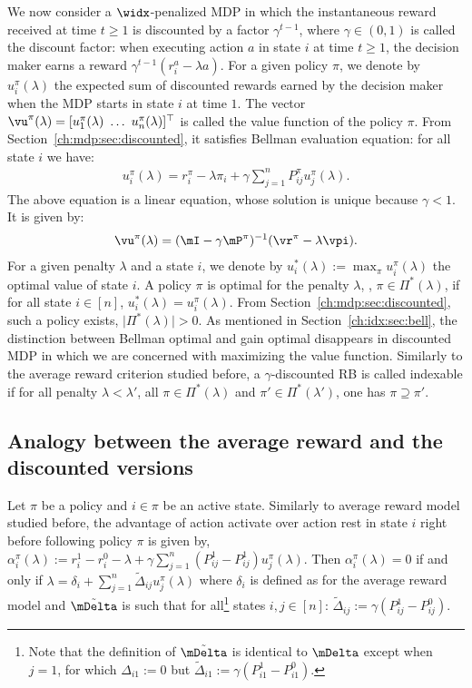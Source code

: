 We now consider a $\widx$-penalized MDP in which the instantaneous reward received at time $t\ge1$ is discounted by a factor $\gamma^{t-1}$, where $\gamma\in(0,1)$ is called the discount factor: when executing action $a$ in state $i$ at time $t\ge1$, the decision maker earns a reward $\gamma^{t-1} (r^a_i - \lambda a)$. For a given policy $\pi$, we denote by $u^\pi_i(\lambda)$ the expected sum of discounted rewards earned by the decision maker when the MDP starts in state $i$ at time $1$. The vector $\vu^\pi(\lambda)=[u^\pi_1(\lambda)\ \dots\ u^\pi_n(\lambda)]^\top$ is called the value function of the policy $\pi$. From Section~\ref{ch:mdp:sec:discounted}, it satisfies Bellman evaluation equation: for all state $i$ we have: 
\begin{align}
    \label{eq:u^pi_discounted}
    u^\pi_i(\lambda) = r_i^{\pi} - \lambda \pi_i + \gamma \sum_{j=1}^n P^{\pi}_{ij} u^\pi_j(\lambda).
\end{align}
The above equation is a linear equation, whose solution is unique because $\gamma<1$. It is given by:
\begin{align}
    \label{eq:h is linear discounted}
    \vu^\pi(\lambda) = (\mI - \gamma \mP^\pi)^{-1}(\vr^{\pi} - \lambda \vpi).
\end{align}
For a given penalty $\lambda$ and a state $i$, we denote by $u^*_i(\lambda):=\max_\pi u^\pi_i(\lambda)$ the optimal value of state $i$.  A policy $\pi$ is optimal for the penalty $\lambda$, \ie, $\pi\in\Pi^*(\lambda)$, if for all state $i\in[n]$, $u^*_i(\lambda)=u^\pi_i(\lambda)$. From Section~\ref{ch:mdp:sec:discounted}, such a policy exists, $\lvert\Pi^*(\lambda)\rvert >0$.
As mentioned in Section~\ref{ch:idx:sec:bell}, the distinction between Bellman optimal and gain optimal disappears in discounted MDP in which we are concerned with maximizing the value function.
Similarly to the average reward criterion studied before, a $\gamma$-discounted RB is called indexable if for all penalty $\lambda<\lambda'$, all $\pi\in\Pi^*(\lambda)$ and $\pi'\in\Pi^*(\lambda')$, one has $\pi\supseteq\pi'$.

\subsection{Analogy between the average reward and the discounted versions}

Let $\pi$ be a policy and $i\in\pi$ be an active state.
Similarly to average reward model studied before, the advantage of action activate over action rest in state $i$ right before following policy $\pi$ is given by,
$\alpha^\pi_i(\lambda):=r^1_i -r^0_i -\lambda +\gamma\sum_{j=1}^n (P^1_{ij} -P^1_{ij})u^\pi_j(\lambda)$.
Then $\alpha^\pi_i(\lambda)=0$ if and only if $\lambda = \delta_i + \sum_{j=1}^n\tilde{\Delta}_{ij} u_j^\pi(\lambda)$ where $\delta_i$ is defined as for the average reward model and $\tilde{\mDelta}$ is such that for all\footnote{Note that the definition of $\tilde{\mDelta}$ is identical to $\mDelta$ except when $j=1$, for which $\Delta_{i1}:=0$ but $\tilde{\Delta}_{i1}:=\gamma(P^1_{i1}-P^0_{i1})$.} states $i,j\in[n]$: $\tilde{\Delta}_{ij}:=\gamma(P^1_{ij}-P^0_{ij})$.

